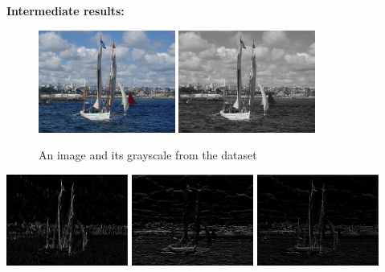 \documentclass[12pt]{article}
\begin{document}
\pagebreak

\qquad\textbf{Intermediate results:}

\begin{figure}[h]
	\centering
	\includegraphics[width=0.4\textwidth]{IAcBBqAmEI.jpg}
	\includegraphics[width=0.4\textwidth]{IAcBBqAmEI_gray.jpg}
	\caption{An image and its grayscale from the dataset}
\end{figure}

\begin{minipage}{\textwidth}
	\centering
	\includegraphics[width=0.3\textwidth]{IAcBBqAmEI_horizontal-0.jpeg}
	\includegraphics[width=0.3\textwidth]{IAcBBqAmEI_vertical-0.jpeg}
	\includegraphics[width=0.3\textwidth]{IAcBBqAmEI_blended-0.jpeg}
	\captionsetup{width=.8\textwidth}
\end{minipage}
\end{document}
